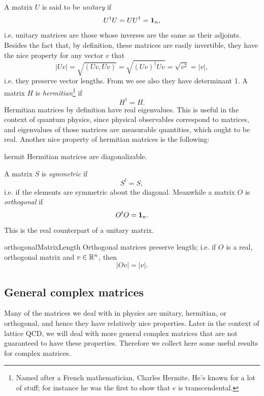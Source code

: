 A matrix $U$ is said to be {\it unitary} if
\begin{equation}\label{eq:unitary}
U^\dagger U=UU^\dagger={\mathbf 1}_n,
\end{equation}
i.e. unitary matrices are those whose inverses are the same as
their adjoints. Besides the fact that, by definition, these
matrices are easily invertible, they have the nice property 
for any vector $v$ that
\begin{equation}
|Uv|=\sqrt{(Uv,Uv)}=\sqrt{(Uv)^\dagger Uv}=\sqrt{v^2}=|v|,
\end{equation}
i.e. they preserve vector lengths. From
 we see also they have determinant 1.
  A matrix $H$ is {\it hermitian}\footnote{Named
after a French mathematician, Charles Hermite. He's known
for a lot of stuff; for instance he was the first to
show that $e$ is transcendental.} if
\begin{equation}
H^\dagger=H. 
\end{equation}
Hermitian matrices by definition have real eigenvalues.
This is useful in the context of quantum physics, since physical observables
correspond to matrices, and eigenvalues of those matrices are measurable
quantities, which ought to be real.
Another nice property of hermitian matrices is the following:

\begin{theorem}{}{hermit}
  Hermitian matrices are diagonalizable.
\end{theorem}

A matrix $S$ is {\it symmetric} if
\begin{equation}
S^t=S,
\end{equation}
i.e. if the elements are symmetric about the diagonal.
Meanwhile a matrix $O$ is {\it orthogonal} if 
\begin{equation}
O^tO={\mathbf 1}_n.
\end{equation}
This is
the real counterpart of a unitary matrix. 
\begin{proposition}{}{orthogonalMatrixLength}
Orthogonal matrices preserve length; i.e. if $O$ is
a real, orthogonal matrix and $v\in\mathbb{R}^n$, then 
$$
|Ov|=|v|.
$$
\end{proposition}

\subsection{General complex matrices}

Many of the matrices we deal with in physics are unitary, hermitian,
or orthogonal, and hence they have relatively nice properties.
Later in the context of lattice QCD, we will deal with more general
complex matrices that are not guaranteed to have these properties.
Therefore we collect here some useful results for complex matrices.


